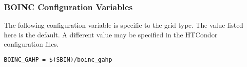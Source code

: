 \subsubsection{\label{sec:Boinc-config}BOINC Configuration Variables}

The following configuration variable is specific to the 
grid type. 
The value listed here is the default. 
A different value may be specified in the HTCondor configuration files.

\footnotesize
\begin{verbatim}
BOINC_GAHP = $(SBIN)/boinc_gahp
\end{verbatim}
\normalsize
